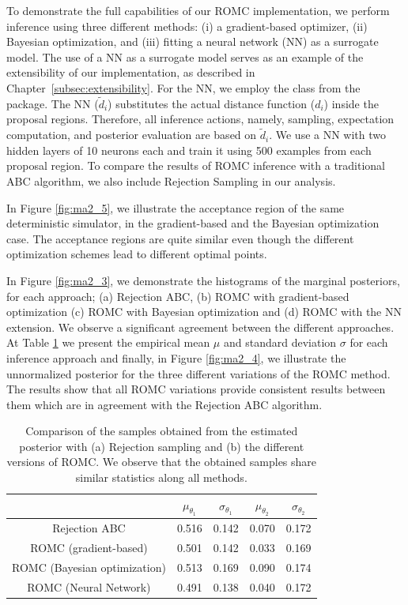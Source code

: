\documentclass[article, shortnames]{jss}
\begin{document}
To demonstrate the full capabilities of our ROMC implementation, we
perform inference using three different methods: (i) a gradient-based
optimizer, (ii) Bayesian optimization, and (iii) fitting a neural
network (NN) as a surrogate model. The use of a NN as a surrogate
model serves as an example of the extensibility of our implementation,
as described in Chapter~\ref{subsec:extensibility}. For the NN, we
employ the  class from the 
package. The NN (\(\tilde{d}_i\)) substitutes the actual distance
function (\(d_i\)) inside the proposal regions. Therefore, all
inference actions, namely, sampling, expectation computation, and
posterior evaluation are based on \(\tilde{d}_i\). We use a NN with
two hidden layers of 10 neurons each and train it using 500 examples
from each proposal region. To compare the results of ROMC inference
with a traditional ABC algorithm, we also include Rejection Sampling
in our analysis.

In Figure \ref{fig:ma2_5}, we illustrate the acceptance region of the
same deterministic simulator, in the gradient-based and the Bayesian
optimization case. The acceptance regions are quite similar even though the
different optimization schemes lead to different optimal points.

In Figure \ref{fig:ma2_3}, we demonstrate the histograms of the
marginal posteriors, for each approach; (a) Rejection ABC, (b) ROMC
with gradient-based optimization (c) ROMC with Bayesian optimization
and (d) ROMC with the NN extension. We observe a significant agreement
between the different approaches. At Table \ref{tab:ma2} we present
the empirical mean \(\mu\) and standard deviation \(\sigma\) for each
inference approach and finally, in Figure \ref{fig:ma2_4}, we
illustrate the unnormalized posterior for the three different
variations of the ROMC method. The results show that all ROMC
variations provide consistent results between them which are in
agreement with the Rejection ABC algorithm.

\begin{table}
\begin{center}
\begin{tabular}{ c|c|c|c|c }
\hline
& \(\mu_{\theta_1}\) & \(\sigma_{\theta_1}\) & \(\mu_{\theta_2}\) & \(\sigma_{\theta_2}\) \\
\hline \hline
Rejection ABC & 0.516 & 0.142 & 0.070 & 0.172 \\
\hline
ROMC (gradient-based) & 0.501 & 0.142 & 0.033 & 0.169 \\
\hline
ROMC (Bayesian optimization) & 0.513 & 0.169 & 0.090 & 0.174 \\
\hline
ROMC (Neural Network) & 0.491 & 0.138 & 0.040 & 0.172 \\
\hline
\end{tabular}
\end{center}
\caption{Comparison of the samples obtained from the estimated
  posterior with (a) Rejection sampling and (b) the different versions
  of ROMC. We observe that the obtained samples share similar
  statistics along all methods. \label{tab:ma2}}
\end{table}
\end{document}
